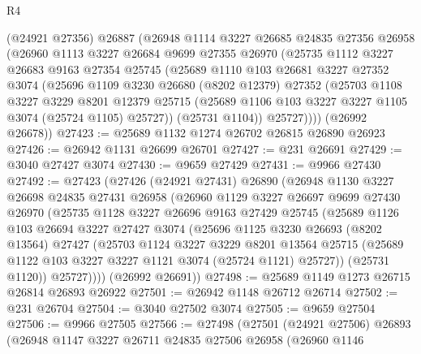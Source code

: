\begin{lexlean}{R4}
\begin{coremodule}
      (@24921 @27356)
      @26887
      (@26948
        @1114
        @3227
        @26685
        @24835
        @27356
        @26958
        (@26960
          @1113
          @3227
          @26684
          @9699
          @27355
          @26970
          (@25735
            @1112
            @3227
            @26683
            @9163
            @27354
            @25745
            (@25689
              @1110
              @103
              @26681
              @3227
              @27352
              @3074
              (@25696
                @1109
                @3230
                @26680
                (@8202 @12379)
                @27352
                (@25703
                  @1108
                  @3227
                  @3229
                  @8201
                  @12379
                  @25715
                  (@25689 @1106 @103 @3227 @3227 @1105 @3074 (@25724 @1105) @25727))
                (@25731 @1104))
              @25727))))
      (@26992 @26678))
@27423 := @25689 @1132 @1274 @26702 @26815 @26890 @26923
@27426 := @26942 @1131 @26699 @26701
@27427 := @231 @26691
@27429 := @3040 @27427 @3074
@27430 := @9659 @27429
@27431 := @9966 @27430
@27492 := @27423
    (@27426
      (@24921 @27431)
      @26890
      (@26948
        @1130
        @3227
        @26698
        @24835
        @27431
        @26958
        (@26960
          @1129
          @3227
          @26697
          @9699
          @27430
          @26970
          (@25735
            @1128
            @3227
            @26696
            @9163
            @27429
            @25745
            (@25689
              @1126
              @103
              @26694
              @3227
              @27427
              @3074
              (@25696
                @1125
                @3230
                @26693
                (@8202 @13564)
                @27427
                (@25703
                  @1124
                  @3227
                  @3229
                  @8201
                  @13564
                  @25715
                  (@25689 @1122 @103 @3227 @3227 @1121 @3074 (@25724 @1121) @25727))
                (@25731 @1120))
              @25727))))
      (@26992 @26691))
@27498 := @25689 @1149 @1273 @26715 @26814 @26893 @26922
@27501 := @26942 @1148 @26712 @26714
@27502 := @231 @26704
@27504 := @3040 @27502 @3074
@27505 := @9659 @27504
@27506 := @9966 @27505
@27566 := @27498
    (@27501
      (@24921 @27506)
      @26893
      (@26948
        @1147
        @3227
        @26711
        @24835
        @27506
        @26958
        (@26960
          @1146

\end{coremodule}
\end{lexlean}
